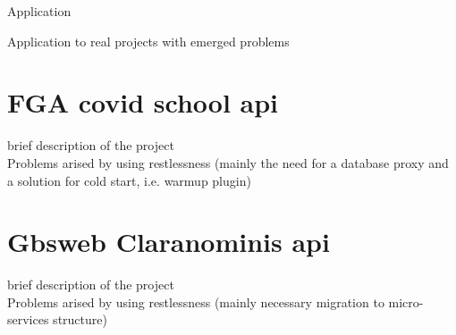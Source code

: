 \begin{chapter}{Application}
    \label{chap:application}

    Application to real projects with emerged problems

    \section{FGA covid school api}
    brief description of the project\\
    Problems arised by using restlessness (mainly the need for a database proxy
    and a solution for cold start, i.e. warmup plugin)


    \section{Gbsweb Claranominis api}
    brief description of the project\\
    Problems arised by using restlessness (mainly necessary migration to micro-services
    structure)

\end{chapter}